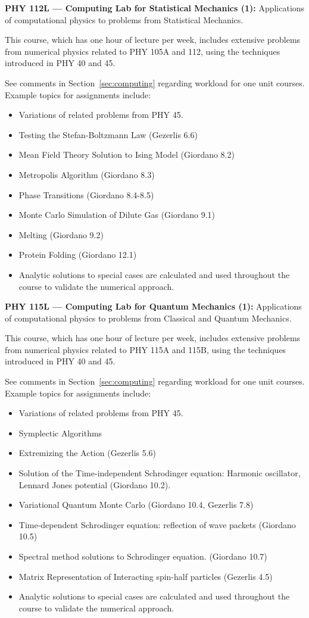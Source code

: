 \documentclass[12pt]{article}
\begin{document}
\vskip 1cm
\noindent
{\bf PHY 112L --- Computing Lab for Statistical Mechanics (1):}
Applications of computational physics to problems from Statistical Mechanics.

This course, which has one hour of lecture per week, includes
extensive problems from numerical physics related to PHY 105A and 112,
using the techniques introduced in PHY 40 and 45.

See comments in Section~\ref{sec:computing} regarding workload for one
unit courses.  Example topics for assignments include:
\begin{itemize}
\item Variations of related problems from PHY 45.
\item Testing the Stefan-Boltzmann Law (Gezerlis 6.6)
\item Mean Field Theory Solution to Ising Model (Giordano 8.2)
\item Metropolis Algorithm (Giordano 8.3)
\item Phase Transitions (Giordano 8.4-8.5)
\item Monte Carlo Simulation of Dilute Gas (Giordano 9.1) 
\item Melting (Giordano 9.2)
\item Protein Folding (Giordano 12.1)
\item Analytic solutions to special cases are calculated and used throughout the
  course to validate the numerical approach.
\end{itemize}


\vskip 1cm
\noindent
{\bf PHY 115L --- Computing Lab for Quantum Mechanics (1):}
Applications of computational physics to problems from Classical and Quantum Mechanics.

This course, which has one hour of lecture per week, includes
extensive problems from numerical physics related to PHY 115A and 115B,
using the techniques introduced in PHY 40 and 45.

See comments in Section~\ref{sec:computing} regarding workload for one
unit courses.  Example topics for assignments include:
\begin{itemize}
\item Variations of related problems from PHY 45.
\item Symplectic Algorithms
\item Extremizing the Action (Gezerlis 5.6)
\item Solution of the Time-independent Schrodinger equation: 
  Harmonic oscillator, Lennard Jones potential (Giordano 10.2).
\item Variational Quantum Monte Carlo (Giordano 10.4, Gezerlis 7.8)
\item Time-dependent Schrodinger equation:  reflection of wave packets (Giordano 10.5)
\item Spectral method solutions to Schrodinger equation.  (Giordano 10.7)
\item Matrix Representation of Interacting spin-half particles (Gezerlis 4.5)
\item Analytic solutions to special cases are calculated and used throughout the
  course to validate the numerical approach.
\end{itemize}
\end{document}
